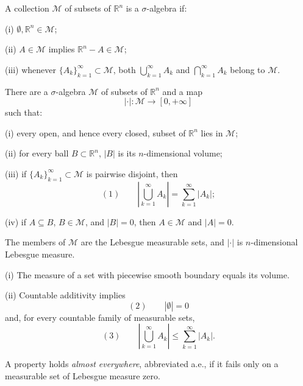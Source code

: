 \begin{definition}
\label{def:sigma-algebra}
A collection $\mathcal M$ of subsets of $\mathbb R^n$ is a $\sigma$-algebra if:

(i) $\emptyset,\mathbb R^n\in\mathcal M$;

(ii) $A\in\mathcal M$ implies $\mathbb R^n-A\in\mathcal M$;

(iii) whenever $\{A_k\}_{k=1}^\infty\subset\mathcal M$, both
$\bigcup_{k=1}^\infty A_k$ and $\bigcap_{k=1}^\infty A_k$ belong to
$\mathcal M$.
\end{definition}

\begin{theorem}
\label{thm:existence-lebesgue-measure}

There are a $\sigma$-algebra $\mathcal M$ of subsets of $\mathbb R^n$ and a map
\[
|\cdot|:\mathcal M\to[0,+\infty]
\]
such that:

(i) every open, and hence every closed, subset of $\mathbb R^n$ lies in
$\mathcal M$;

(ii) for every ball $B\subset\mathbb R^n$, $|B|$ is its $n$-dimensional
volume;

(iii) if $\{A_k\}_{k=1}^\infty\subset\mathcal M$ is pairwise disjoint, then
\[
(1)\qquad
\left|\bigcup_{k=1}^\infty A_k\right|=\sum_{k=1}^\infty|A_k|;
\]

(iv) if $A\subseteq B$, $B\in\mathcal M$, and $|B|=0$, then
$A\in\mathcal M$ and $|A|=0$.

The members of $\mathcal M$ are the Lebesgue measurable sets, and $|\cdot|$ is
$n$-dimensional Lebesgue measure.
\end{theorem}

\begin{remark}
\label{rem:lebesgue-measure-properties}

(i) The measure of a set with piecewise smooth boundary equals its volume.

(ii) Countable additivity implies
\[
(2)\qquad |\emptyset|=0
\]
and, for every countable family of measurable sets,
\[
(3)\qquad
\left|\bigcup_{k=1}^\infty A_k\right|\leq\sum_{k=1}^\infty|A_k|.
\]
\end{remark}

\begin{definition}
\label{def:almost-everywhere}

A property holds \textit{almost everywhere}, abbreviated a.e., if it fails only
on a measurable set of Lebesgue measure zero.
\end{definition}

